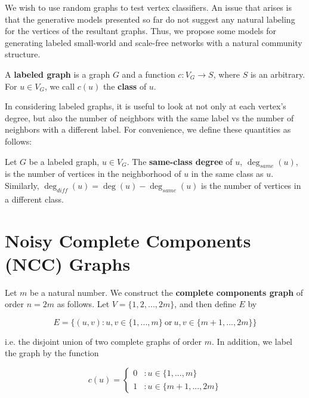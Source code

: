 We wish to use random graphs to test vertex classifiers. An issue that arises is that the generative
models presented so far do not suggest any natural labeling for the vertices of the resultant graphs.
Thus, we propose some models for generating labeled small-world and scale-free networks with a natural community structure.

\begin{definition}
  A \textbf{labeled graph} is a graph $G$ and a function $c : V_G \to S$, where $S$ is an arbitrary.
  For $u \in V_G$, we call $c(u)$ the \textbf{class} of $u$.
\end{definition}

In considering labeled graphs, it is useful to look at not only at each vertex's degree, but also the
number of neighbors with the same label vs the number of neighbors with a different label. For
convenience, we define these quantities as follows:

\begin{definition}
  Let $G$ be a labeled graph, $u \in V_G$. The \textbf{same-class degree} of $u$, $\deg_{\textit{same}}(u)$, is
  the number of vertices in the neighborhood of $u$ in the same class as $u$. Similarly, $\deg_{\textit{diff}}(u) =
  \deg(u) - \deg_{\textit{same}}(u)$ is the number of vertices in a different class.
\end{definition}


\section{Noisy Complete Components (NCC) Graphs}

\begin{definition}
  Let $m$ be a natural number. We construct the \textbf{complete components
    graph} of order $n = 2m$ as follows. Let $V = \{1,2, ..., 2m\}$, and then define
  $E$ by

  \[
    E = \{ (u,v) : u,v \in \{1,...,m\} ~\text{or}~ u,v \in \{m+1,...,2m\} \}
  \]

  i.e. the disjoint union of two complete graphs of order $m$. In addition, we label the graph by the
  function

  \[c(u) =
      \begin{cases}
        0 &: u \in \{1,...,m\} \\
        1 &: u \in \{m+1,...,2m\}
      \end{cases}
    \]
\end{definition}

